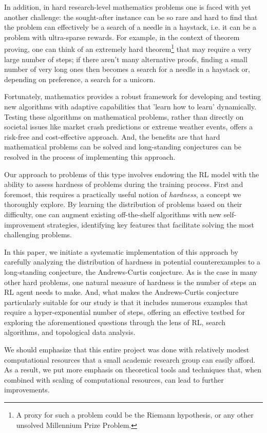 In addition, in hard research-level mathematics problems one is faced with yet another challenge: the sought-after instance can be so rare and hard to find that the problem can effectively be a search of a needle in a haystack, i.e. it can be a problem with ultra-sparse rewards. For example, in the context of theorem proving, one can think of an extremely hard theorem\footnote{A proxy for such a problem could be the Riemann hypothesis, or any other unsolved Millennium Prize Problem.} that may require a very large number of steps; if there aren't many alternative proofs, finding a small number of very long ones then becomes a search for a needle in a haystack or, depending on preference, a search for a unicorn.

Fortunately, mathematics provides a robust framework for developing and testing new algorithms with adaptive capabilities that 'learn how to learn' dynamically. Testing these algorithms on mathematical problems, rather than directly on societal issues like market crash predictions or extreme weather events, offers a risk-free and cost-effective approach. And, the benefits are that hard mathematical problems can be solved and long-standing conjectures can be resolved in the process of implementing this approach.

Our approach to problems of this type involves endowing the RL model with the ability to assess hardness of problems during the training process. First and foremost, this requires a practically useful notion of {\it hardness}, a concept we thoroughly explore. By learning the distribution of problems based on their difficulty, one can augment existing off-the-shelf algorithms with new self-improvement strategies, identifying key features that facilitate solving the most challenging problems.

In this paper, we initiate a systematic implementation of this approach by carefully analyzing the distribution of hardness in potential counterexamples to a long-standing conjecture, the Andrews-Curtis conjecture. As is the case in many other hard problems, one natural measure of hardness is the number of steps an RL agent needs to make. And, what makes the Andrews-Curtis conjecture particularly suitable for our study is that it includes numerous examples that require a hyper-exponential number of steps, offering an effective testbed for exploring the aforementioned questions through the lens of RL, search algorithms, and topological data analysis.

We should emphasize that this entire project was done with relatively modest computational resources that a small academic research group can easily afford. As a result, we put more emphasis on theoretical tools and techniques that, when combined with scaling of computational resources, can lead to further improvements.

